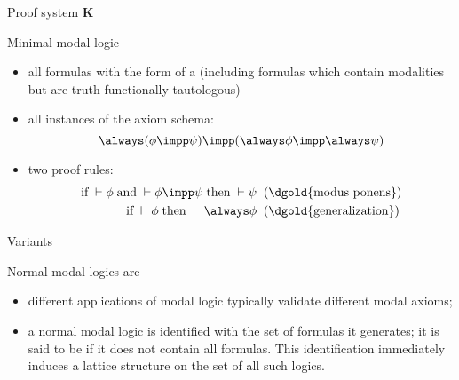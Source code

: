 \documentclass{beamer}
\begin{document}
\begin{slide}{Proof system $\mathbf{K}$}\label{s:37}
\small

\begin{block}{Minimal modal logic}

\begin{itemize}
\item all formulas with the form of a  (including formulas which contain  modalities 
but are truth-functionally tautologous) 
\item all instances of  the axiom schema:
\begin{equation*}
\always (\phi \impp \psi) \impp (\always \phi \impp \always \psi)
\end{equation*}
\item two proof rules:
\begin{align*}
\text{if}\; \vdash \phi\; \text{and}\;  \vdash \phi \impp \psi\; \text{then}\;  \vdash \psi &\; \; \text{(\dgold{modus ponens})} \\
\text{if}\; \vdash \phi\; \text{then}\;  \vdash \always \phi &\; \; \text{(\dgold{generalization})} \\
\end{align*}
\end{itemize}
\end{block}
  
\end{slide}

\begin{slide}{Variants}\label{s:38}
\small

Normal modal logics are 

\begin{itemize}
\item
different applications of modal logic typically validate different modal axioms;



\item a normal modal logic is identified with the set of formulas it generates; it is said to be  if it does not contain all formulas. This identification immediately induces a lattice structure on the set of all such logics.
\end{itemize}

  
\end{slide}
\end{document}

